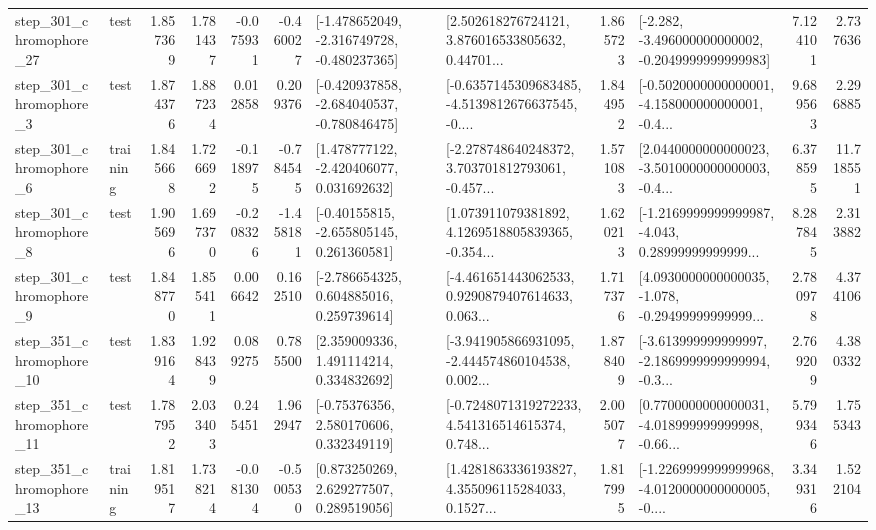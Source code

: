 \begin{tabular}{llrrrrllrlrr}
  step\_301\_chromophore\_27 &      test &      1.857369 &    1.781437 &     -0.075931 & -0.460027 &  [-1.478652049, -2.316749728, -0.480237365] &  [2.502618276724121, 3.876016533805632, 0.44701... &       1.865723 &  [-2.282, -3.496000000000002, -0.2049999999999983] &            7.124101 &          2.737636 \\
   step\_301\_chromophore\_3 &      test &      1.874376 &    1.887234 &      0.012858 &  0.209376 &  [-0.420937858, -2.684040537, -0.780846475] &  [-0.6357145309683485, -4.5139812676637545, -0.... &       1.844952 &  [-0.5020000000000001, -4.158000000000001, -0.4... &            9.689563 &          2.296885 \\
   step\_301\_chromophore\_6 &  training &      1.845668 &    1.726692 &     -0.118975 & -0.784545 &    [1.478777122, -2.420406077, 0.031692632] &  [-2.278748640248372, 3.703701812793061, -0.457... &       1.571083 &  [2.0440000000000023, -3.5010000000000003, -0.4... &            6.378595 &         11.718551 \\
   step\_301\_chromophore\_8 &      test &      1.905696 &    1.697370 &     -0.208326 & -1.458181 &    [-0.40155815, -2.655805145, 0.261360581] &  [1.073911079381892, 4.1269518805839365, -0.354... &       1.620213 &  [-1.2169999999999987, -4.043, 0.28999999999999... &            8.287845 &          2.313882 \\
   step\_301\_chromophore\_9 &      test &      1.848770 &    1.855411 &      0.006642 &  0.162510 &    [-2.786654325, 0.604885016, 0.259739614] &  [-4.461651443062533, 0.9290879407614633, 0.063... &       1.717376 &  [4.0930000000000035, -1.078, -0.29499999999999... &            2.780978 &          4.374106 \\
  step\_351\_chromophore\_10 &      test &      1.839164 &    1.928439 &      0.089275 &  0.785500 &     [2.359009336, 1.491114214, 0.334832692] &  [-3.941905866931095, -2.444574860104538, 0.002... &       1.878409 &  [-3.613999999999997, -2.1869999999999994, -0.3... &            2.769209 &          4.380332 \\
  step\_351\_chromophore\_11 &      test &      1.787952 &    2.033403 &      0.245451 &  1.962947 &     [-0.75376356, 2.580170606, 0.332349119] &  [-0.7248071319272233, 4.541316514615374, 0.748... &       2.005077 &  [0.7700000000000031, -4.018999999999998, -0.66... &            5.799346 &          1.755343 \\
  step\_351\_chromophore\_13 &  training &      1.819517 &    1.738214 &     -0.081304 & -0.500530 &     [0.873250269, 2.629277507, 0.289519056] &  [1.4281863336193827, 4.355096115284033, 0.1527... &       1.817995 &  [-1.2269999999999968, -4.0120000000000005, -0.... &            3.349316 &          1.522104 \\

\end{tabular}
